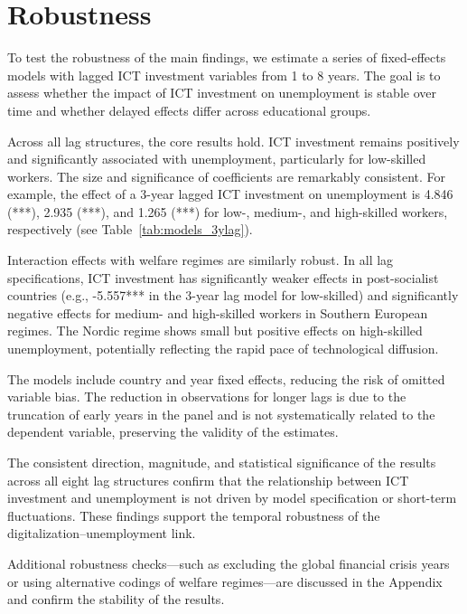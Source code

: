 
\section{Robustness}

To test the robustness of the main findings, we estimate a series of fixed-effects models with lagged 
ICT investment variables from 1 to 8 years. The goal is to assess whether the impact of ICT 
investment on unemployment is stable over time and whether delayed effects differ across educational 
groups.

Across all lag structures, the core results hold. ICT investment remains positively and 
significantly associated with unemployment, particularly for low-skilled workers. The size and 
significance of coefficients are remarkably consistent. For example, the effect of a 3-year lagged 
ICT investment on unemployment is 4.846 (***), 2.935 (***), and 1.265 (***) for low-, medium-, and 
high-skilled workers, respectively (see Table~\ref{tab:models_3ylag}).

Interaction effects with welfare regimes are similarly robust. In all lag specifications, ICT 
investment has significantly weaker effects in post-socialist countries (e.g., -5.557*** in the 
3-year lag model for low-skilled) and significantly negative effects for medium- and high-skilled 
workers in Southern European regimes. The Nordic regime shows small but positive effects on 
high-skilled unemployment, potentially reflecting the rapid pace of technological diffusion.

The models include country and year fixed effects, reducing the risk of omitted variable bias. The 
reduction in observations for longer lags is due to the truncation of early years in the panel and 
is not systematically related to the dependent variable, preserving the validity of the estimates.

The consistent direction, magnitude, and statistical significance of the results across all eight lag 
structures confirm that the relationship between ICT investment and unemployment is not driven by 
model specification or short-term fluctuations. These findings support the temporal robustness of the 
digitalization–unemployment link.

Additional robustness checks—such as excluding the global financial crisis years or using alternative 
codings of welfare regimes—are discussed in the Appendix and confirm the stability of the results.

